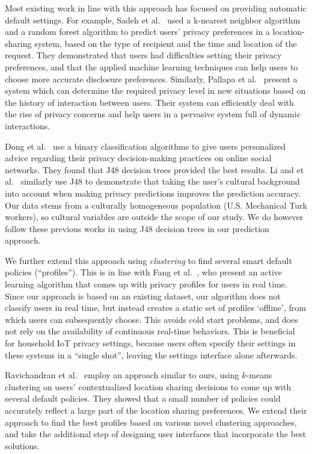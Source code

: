 Most existing work in line with this approach has focused on providing automatic default settings. For example, Sadeh et al.~\cite{sadeh2009understanding} used a k-nearest neighbor algorithm and a random forest algorithm to predict users' privacy preferences in a location-sharing system, based on the type of recipient and the time and location of the request. They demonstrated that users had difficulties setting their privacy preferences, and that the applied machine learning techniques can help users to choose more accurate disclosure preferences. Similarly, Pallapa et al.~\cite{pallapa2014adaptive} present a system which can determine the required privacy level in new situations based on the history of interaction between users. Their system can efficiently deal with the rise of privacy concerns and help users in a pervasive system full of dynamic interactions.

Dong et al.~\cite{dong2016ppm} use a binary classification algorithms to give users personalized advice regarding their privacy decision-making practices on online social networks. They found that J48 decision trees provided the best results. Li and et al.~\cite{li2017cross} similarly use J48 to demonstrate that taking the user's cultural background into account when making privacy predictions improves the prediction accuracy. Our data stems from a culturally homogeneous population (U.S. Mechanical Turk workers), so cultural variables are outside the scope of our study. We do however follow these previous works in using J48 decision trees in our prediction approach.

We further extend this approach using \emph{clustering} to find several smart default policies (``profiles''). This is in line with Fang et al.~\cite{fang2010privacy}, who present an active learning algorithm that comes up with privacy profiles for users in real time. Since our approach is based on an existing dataset, our algorithm does not classify users in real time, but instead creates a static set of profiles `offline', from which users can subsequently choose. This avoids cold start problems, and does not rely on the availability of continuous real-time behaviors. This is beneficial for household IoT privacy settings, because users often specify their settings in these systems in a ``single shot'', leaving the settings interface alone afterwards.

Ravichandran et al.~\cite{ravichandran2009capturing} employ an approach similar to ours, using $k$-means clustering on users' contextualized location sharing decisions to come up with several default policies. They showed that a small number of policies could accurately reflect a large part of the location sharing preferences. We extend their approach to find the best profiles based on various novel clustering approaches, and take the additional step of designing user interfaces that incorporate the best solutions.

